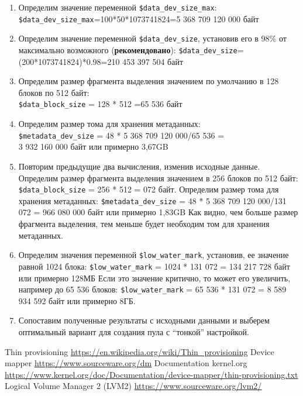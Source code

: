 \documentclass[10pt, a5paper]{article}
\begin{document}
\begin{enumerate}
  \item Определим значение переменной \verb!$data_dev_size_max!:\\
\verb!$data_dev_size_max!=100*50*1073741824=5 368 709 120 000 \linebreak байт
  \item Определим значение переменной \verb!$data_dev_size!, установив его в 98\% от максимально возможного (\textbf{рекомендовано}): 
\verb!$data_dev_size!=(200*1073741824)*0.98=210 453 397 504 байт
  \item Определим размер фрагмента выделения значением по умолчанию в 128 блоков по 512 байт:\\
 \verb!$data_block_size! = 128 * 512 =65 536 байт
  \item Определим размер тома для хранения метаданных:\\
 \verb!$metadata_dev_size! = 48 * 5 368 709 120 000/65 536 = \\ 3 932 160 000 байт или примерно 3,67GB
  \item Повторим предыдущие два вычисления, изменив исходные \linebreak данные.
Определим размер фрагмента выделения значением в 256 блоков по 512 байт:
 \verb!$data_block_size! = 256 * 512 =  072 байт.
Определим размер тома для хранения метаданных:
 \verb!$metadata_dev_size! = 48 * 5 368 709 120 000/131 072 =  966 080 000 байт или примерно 1,83GB
 Как видно, чем больше размер фрагмента выделения, тем меньше будет необходим том для хранения метаданных.
  \item Определим значения переменной \verb!$low_water_mark!, установив, ее значение равной 1024 блока: 
 \verb!$low_water_mark! = 1024 * 131 072 = 134 217 728 байт или примерно 128МБ
 Если это значение критично, то может его увеличить, например до 65 536 блоков:
 \verb!$low_water_mark! =  65 536 * 131 072 = 8 589 934 592 байт или примерно 8ГБ.
  \item Сопоставим полученные результаты с исходными данными и выберем  оптимальный вариант для создания пула с ``тонкой'' настройкой.
\end{enumerate}

\begin{thebibliography}{9}
 {Thin provisioning \url{https://en.wikipedia.org/wiki/Thin_provisioning}}
 {Device mapper \url{https://www.sourceware.org/dm}}
 {Documentation kernel.org \url{https://www.kernel.org/doc/Documentation/device-mapper/thin-provisioning.txt}}
 {Logical Volume Manager 2 (LVM2) \url{https://www.sourceware.org/lvm2/}}\end{thebibliography}
\end{document}
